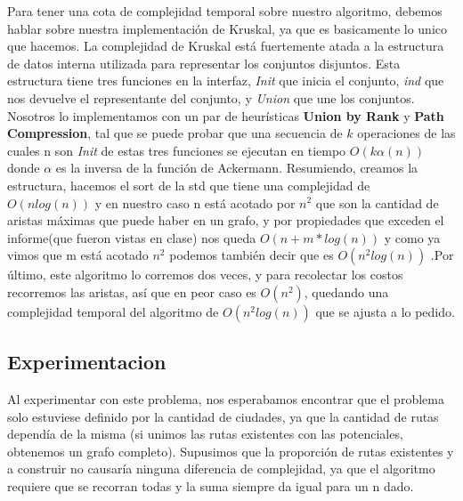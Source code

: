 Para tener una cota de complejidad temporal sobre nuestro algoritmo, debemos hablar sobre nuestra implementación de Kruskal, ya que es basicamente lo unico que hacemos.
La complejidad de Kruskal está fuertemente atada a la estructura de datos interna utilizada para representar los conjuntos disjuntos. Esta estructura tiene tres funciones en la interfaz, \textit{Init} que inicia el conjunto, \textit{ind} que nos devuelve el representante del conjunto, y \textit{Union} que une los conjuntos. Nosotros lo implementamos con un par de heurísticas \textbf{Union by Rank} y \textbf{Path Compression}, tal que se puede probar que una secuencia de $k$ operaciones de las cuales n son \textit{Init} de estas tres funciones se ejecutan en tiempo $O(k\alpha (n))$ donde $\alpha$ es la inversa de la función de Ackermann. Resumiendo, creamos la estructura, hacemos el sort de la std que tiene una complejidad de $O(nlog(n))$ y en nuestro caso n está acotado por $n^2$ que son la cantidad de aristas máximas que puede haber en un grafo, y por propiedades que exceden el informe(que fueron vistas en clase) nos queda $O(n + m*log(n))$ y como ya vimos que m está acotado $n^2$ podemos también decir que es $O(n^2log(n))$ .Por último, este algoritmo lo corremos dos veces, y para recolectar los costos recorremos las aristas, así que en peor caso es $O(n^2)$, quedando una complejidad temporal del algoritmo de $O(n^2log(n))$ que se ajusta a lo pedido.

\subsection{Experimentacion}

Al experimentar con este problema, nos esperabamos encontrar que el problema solo estuviese definido por la cantidad de ciudades, ya que la cantidad de rutas dependía de la misma (si unimos las rutas existentes con las potenciales, obtenemos un grafo completo). Supusimos que la proporción de rutas existentes y a construir no causaría ninguna diferencia de complejidad, ya que el algoritmo requiere que se recorran todas y la suma siempre da igual para un n dado.

